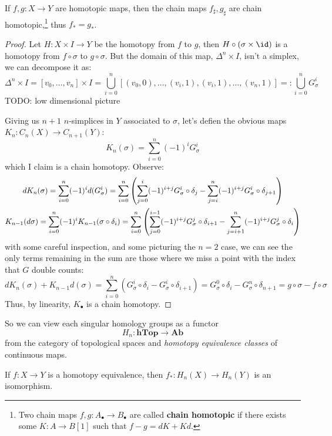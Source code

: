 \documentclass{article}
\begin{document}
\begin{proposition}
    If $f,g:X\rightarrow Y$ are homotopic maps, then the chain maps $f_\sharp,g_\sharp$ are chain homotopic,\footnote{Two chain maps $f,g:A_\bullet\rightarrow B_\bullet$ are called \textbf{chain homotopic} if there exists some $K:A\rightarrow B[1]$ such that $f-g=dK+Kd$.} thus $f_*=g_*$.

    \begin{proof}
        Let $H:X\times I\rightarrow Y$ be the homotopy from $f$ to $g$, then $H\circ(\sigma\times\id)$ is a homotopy from $f\circ\sigma$ to $g\circ\sigma$. But the domain of this map, $\Delta^n\times I$, isn't a simplex, we can decompose it as: \[
        \Delta^n\times I = [v_0,\ldots,v_n]\times I = \bigcup_{i=0}^n[(v_0,0),\ldots,(v_i,1),(v_i,1),\ldots,(v_n,1)] =: \bigcup_{i=0}^nG_\sigma^i
        \]TODO: low dimensional picture 

        Giving us $n+1$ $n$-simplices in $Y$ associated to $\sigma$, let's defien the obvious maps $K_n:C_n(X)\rightarrow C_{n+1}(Y)$: \[
        K_n(\sigma) = \sum_{i=0}^n(-1)^iG_\sigma^i
        \] which I claim is a chain homotopy. Observe: \begin{gather*}
        dK_n(\sigma) = \sum_{i=0}^n(-1)^id(G_\sigma^i) = 
        \sum_{i=0}^n\left( \sum_{j=0}^i (-1)^{i+j}G_\sigma^i\circ \delta_j - \sum_{j=i}^n(-1)^{i+j}G_\sigma^i\circ\delta_{j+1} \right)\\
        K_{n-1}(d\sigma) = \sum_{i=0}^n(-1)^iK_{n-1}(\sigma\circ\delta_i) = 
        \sum_{i=0}^n\left( \sum_{j=0}^{i-1} (-1)^{i+j}G_\sigma^j\circ \delta_{i+1} - \sum_{j=i+1}^n(-1)^{i+j}G_\sigma^j\circ\delta_i \right)
        \end{gather*}
        with some careful inspection, and some picturing the $n=2$ case, we can see the only terms remaining in the sum are those where we miss a point with the index that $G$ double counts: \[
            dK_n(\sigma) + K_{n-1}d(\sigma) = \sum_{i=0}^n(G_\sigma^i\circ\delta_i - G_\sigma^i\circ\delta_{i+1}) = G_\sigma^0\circ\delta_i - G_\sigma^n\circ\delta_{n+1} = g\circ\sigma - f\circ\sigma
        \] Thus, by linearity, $K_\bullet$ is a chain homotopy.
    \end{proof}
\end{proposition}

So we can view each singular homology groups as a functor \[
H_n:\textbf{hTop}\rightarrow\textbf{Ab}
\] from the category of topological spaces and \textit{homotopy equivalence classes} of continuous maps.

\begin{corollary}
    If $f:X\rightarrow Y$ is a homotopy equivalence, then $f_*:H_n(X)\rightarrow H_n(Y)$ is an isomorphism.
\end{corollary}
\end{document}
